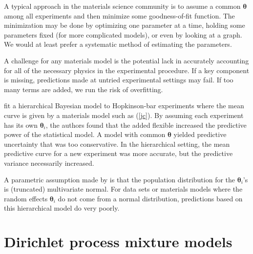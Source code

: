 \documentclass[12pt]{article}
\newcommand{\m}[1]{\mathbf{\bm{#1}}}
\begin{document}
A typical approach in the materials science community is to assume a common $\m{\theta}$ among all experiments and then minimize some goodness-of-fit function. The minimization may be done by optimizing one parameter at a time, holding some parameters fixed (for more complicated models), or even by looking at a graph. We would at least prefer a systematic method of estimating the parameters.

A challenge for any materials model is the potential lack in accurately accounting for all of the necessary physics in the experimental procedure. If a key component is missing, predictions made at untried experimental settings may fail. If too many terms are added, we run the risk of overfitting.

\cite{fugate2005hierarchical} fit a hierarchical Bayesian model to Hopkinson-bar experiments where the mean curve is given by a materials model such as (\ref{jc}). By assuming each experiment has its own $\m{\theta}_i$, the authors found that the added flexible increased the predictive power of the statistical model. A model with common $\m{\theta}$ yielded predictive uncertainty that was too conservative. In the hierarchical setting, the mean predictive curve for a new experiment was more accurate, but the predictive variance necessarily increased.

A parametric assumption made by \cite{fugate2005hierarchical} is that the population distribution for the $\m{\theta}_i$'s is (truncated) multivariate normal. For data sets or materials models where the random effects $\m{\theta}_i$ do not come from a normal distribution, predictions based on this hierarchical model do very poorly.

\section{Dirichlet process mixture models}
\end{document}
